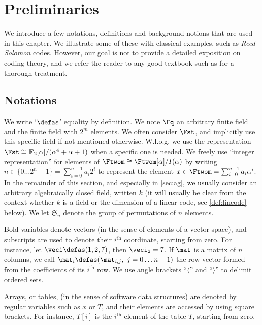 \section{Preliminaries}
\label{not}

We introduce a few notations, definitions and background notions that are used in this chapter. We illustrate some of these with classical examples, such as \emph{Reed-Solomon} codes. However,
our goal is not to provide a detailed exposition on coding theory, and we refer the reader to any good textbook such as \cite{vanlint} for a thorough treatment.

\subsection{Notations}
We write `$\defas$' equality by definition.
We note $\Fq$ an arbitrary finite field and \Ftwom{} the finite field with $2^m$ elements. We often consider $\Fst$, and implicitly use this specific field if not mentioned otherwise.
W.l.o.g. we use the representation
$\Fst \cong \mathbf{F}_2[\alpha]/(\alpha^4 + \alpha + 1)$ when a specific one is needed. We freely use ``integer representation'' for elements of $\Ftwom \cong \Ftwom[\alpha]/I(\alpha)$
by writing $n \in \{0\ldots2^n-1\} = \sum_{i = 0}^{n-1} a_i 2^i$ to represent the element
$x \in \Ftwom = \sum_{i = 0}^{n-1} a_i \alpha^i$. In the remainder of this section, and especially in \autoref{sec:ag}, we usually consider an arbitrary algebraically closed field, written $k$
(it will usually be clear from the context whether $k$ is a field or the dimension of a linear code, see \autoref{def:lincode} below).
We let $\mathfrak{S}_n$ denote the group of permutations of $n$ elements.

Bold variables denote vectors (in the sense of elements of a vector space), and subscripts are used to denote their $i^\text{th}$ coordinate, starting from zero. For instance,
let $\veci \defas (1, 2, 7)$, then  $\veci_2 = 7$.
If $\mat$ is a matrix of $n$ columns, we call $\mat_i \defas (\mat_{i,j},~j = 0\ldots n - 1)$ the row vector formed from the coefficients of
its $i^\text{th}$ row.
We use angle brackets ``$\langle$'' and ``$\rangle$'' to delimit ordered sets.

Arrays, or tables, (in the sense of software data structures) are denoted by regular variables such as $x$ or $T$, and their elements are accessed by using square brackets.
For instance, $T[i]$ is the $i^\text{th}$ element of the table $T$, starting from zero.

